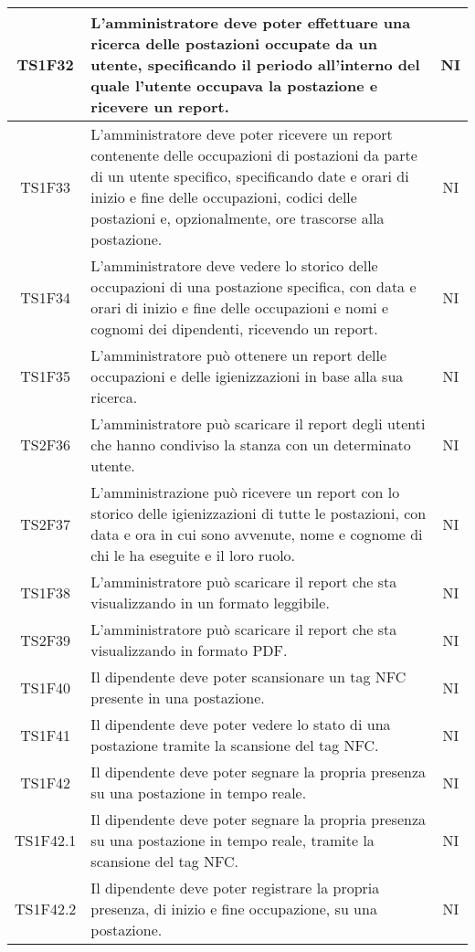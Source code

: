 \begin{center}
\begin{longtable}{|c|p{10cm}|c|}
			\hline
			TS1F32 & L'amministratore deve poter effettuare una ricerca delle postazioni occupate da un utente, specificando il periodo all'interno del quale l'utente occupava la postazione e ricevere un report. & NI \\	
			\hline
			TS1F33 & L'amministratore deve poter ricevere un report contenente delle occupazioni di postazioni da parte di un utente specifico, specificando date e orari di inizio e fine delle occupazioni, codici delle postazioni e, opzionalmente, ore trascorse alla postazione. & NI \\	
			\hline
			TS1F34 & L'amministratore deve vedere lo storico delle occupazioni di una postazione specifica, con data e orari di inizio e fine delle occupazioni e nomi e cognomi dei dipendenti, ricevendo un report. & NI \\			
			\hline
			TS1F35 & L'amministratore può ottenere un report delle
			occupazioni e delle igienizzazioni in base alla sua ricerca. & NI \\		
			\hline		
			TS2F36 & L'amministratore può scaricare il report degli utenti che hanno condiviso la stanza con un determinato utente. & NI \\		
			\hline
			TS2F37 & L'amministrazione può ricevere un report con lo storico delle igienizzazioni di tutte le postazioni, con data e ora in cui sono avvenute, nome e cognome di chi le ha eseguite e il loro ruolo. & NI \\	
			\hline
			TS1F38 & L'amministratore può scaricare il report che sta visualizzando in un formato leggibile. & NI \\	
			\hline
			TS2F39 & L'amministratore può scaricare il report che sta visualizzando in formato PDF. & NI \\	
			\hline			
			TS1F40 & Il dipendente deve poter scansionare un tag NFC presente in una postazione. & NI \\	
			\hline
			TS1F41 & Il dipendente deve poter vedere lo stato di una postazione tramite la scansione del tag NFC. & NI \\	
			\hline
			TS1F42 & Il dipendente deve poter segnare la propria presenza su una postazione in tempo reale. & NI \\	
			\hline			
			TS1F42.1 & Il dipendente deve poter segnare la propria presenza su una postazione in tempo reale, tramite la scansione del tag NFC. & NI \\	
			\hline
			TS1F42.2 & Il dipendente deve poter registrare la propria presenza, di inizio e fine occupazione, su una postazione. & NI \\		

\end{longtable}
\end{center}
